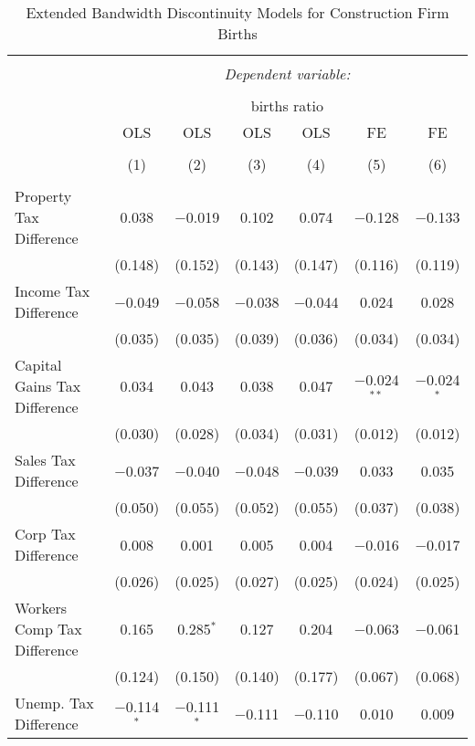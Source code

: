 
\begin{table}[!htbp] \centering 
  \caption{Extended Bandwidth Discontinuity Models for  Construction Firm Births} 
  \label{23eb} 
\footnotesize 
\begin{tabular}{@{\extracolsep{5pt}}lcccccc} 
\\[-1.8ex]\hline 
\hline \\[-1.8ex] 
 & \multicolumn{6}{c}{\textit{Dependent variable:}} \\ 
\cline{2-7} 
\\[-1.8ex] & \multicolumn{6}{c}{births ratio} \\ 
 & OLS & OLS & OLS & OLS & FE & FE \\ 
\\[-1.8ex] & (1) & (2) & (3) & (4) & (5) & (6)\\ 
\hline \\[-1.8ex] 
 Property Tax Difference & 0.038 & $-$0.019 & 0.102 & 0.074 & $-$0.128 & $-$0.133 \\ 
  & (0.148) & (0.152) & (0.143) & (0.147) & (0.116) & (0.119) \\ 
  Income Tax Difference & $-$0.049 & $-$0.058 & $-$0.038 & $-$0.044 & 0.024 & 0.028 \\ 
  & (0.035) & (0.035) & (0.039) & (0.036) & (0.034) & (0.034) \\ 
  Capital Gains Tax Difference & 0.034 & 0.043 & 0.038 & 0.047 & $-$0.024$^{**}$ & $-$0.024$^{*}$ \\ 
  & (0.030) & (0.028) & (0.034) & (0.031) & (0.012) & (0.012) \\ 
  Sales Tax Difference & $-$0.037 & $-$0.040 & $-$0.048 & $-$0.039 & 0.033 & 0.035 \\ 
  & (0.050) & (0.055) & (0.052) & (0.055) & (0.037) & (0.038) \\ 
  Corp Tax Difference & 0.008 & 0.001 & 0.005 & 0.004 & $-$0.016 & $-$0.017 \\ 
  & (0.026) & (0.025) & (0.027) & (0.025) & (0.024) & (0.025) \\ 
  Workers Comp Tax Difference & 0.165 & 0.285$^{*}$ & 0.127 & 0.204 & $-$0.063 & $-$0.061 \\ 
  & (0.124) & (0.150) & (0.140) & (0.177) & (0.067) & (0.068) \\ 
  Unemp. Tax Difference & $-$0.114$^{*}$ & $-$0.111$^{*}$ & $-$0.111 & $-$0.110 & 0.010 & 0.009 \\ 

\end{tabular}
\end{table}
